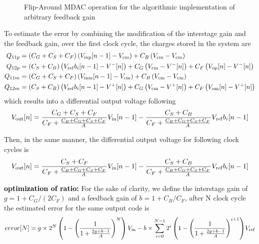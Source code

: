 \begin{figure}[htp]
\begin{subfigure}[b]{0.45\textwidth}
		\label{fig:algo-mdac-phi2}
	\end{subfigure}
	\caption{Flip-Around MDAC operation for the algorithmic implementation of arbitrary feedback gain}
	\label{fig:algo-mdac-cb}
\end{figure}

To estimate the error by combining the modification of the interstage gain and the feedback gain, over the first clock cycle, the charges stored in the system are
\begin{align}
Q_{11p} &= \left(C_G+C_S+C_F \right) \left( V_{\rm inp}[n-1] - V_{\rm cm} \right) + C_B \left(V_{\rm cm}-V_{\rm cm} \right) \\
Q_{12p} &= \left(C_S+C_B \right) \left( V_{\rm ref}b_i[n-1] - V^{-}[n] \right) + C_G \left(V_{\rm cm}-V^{-}[n] \right)  + C_F \left(V_{\rm op}[n]-V^{-}[n] \right) \\
Q_{11m} &= \left(C_G+C_S+C_F \right) \left( V_{\rm inm}[n-1] - V_{\rm cm} \right) + C_B \left(V_{\rm cm}-V_{\rm cm} \right) \\
Q_{12m} &= \left(C_S+C_B \right) \left( V_{\rm ref}b_i[n-1] - V^{+}[n] \right) + C_G \left(V_{\rm cm}-V^{+}[n] \right)  + C_F \left(V_{\rm om}[n]-V^{+}[n] \right) 
\end{align}
which results into a differential output voltage following 
\begin{equation}
	V_{\rm out}[n] = \frac{C_G+C_S+C_F}{C_F+\frac{C_B+C_G+C_S+C_F}{A}} V_{\rm in}[n-1] - \frac{C_S+C_B}{C_F+\frac{C_B+C_G+C_S+C_F}{A}} V_{\rm ref}b_i[n-1]
\end{equation}

Then, in the same manner, the differential output voltage for following clock cycles is
\begin{equation}
	V_{\rm out}[n] = \frac{C_S+C_F}{C_F+\frac{C_B+C_G+C_S+C_F}{A}} V_{\rm in}[n-1] - \frac{C_S+C_B}{C_F+\frac{C_B+C_G+C_S+C_F}{A}} V_{\rm ref}b_i[n-1]
\end{equation}

\textbf{\textcolor{black}{optimization of ratio:}}
For the sake of clarity, we define the interstage gain of \(g = 1+C_G/(2C_F)\) and a feedback gain of \(b = 1+C_B/C_F\), after N clock cycle the estimated error for the same output code is
\begin{equation}
	error[N] = g \times 2^N \left(1-{\left(\frac{1}{1+\frac{2g+b-1}{A}} \right)}^N \right) V_{\rm in} - b \times \sum_{i=0}^{N-1}{2^i\left(1-{\left(\frac{1}{1+\frac{2g+b-1}{A}} \right)}^{i+1} \right)} V_{\rm ref}
\end{equation}


